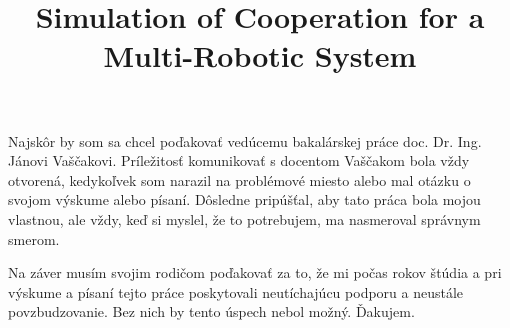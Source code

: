\documentclass[]{tukediphc}
\title{Simulation of Cooperation for a Multi-Robotic System}
\begin{document}
\renewcommand{\figurename}{Obrázok}	
\renewcommand\theHfigure{\theHsection.\arabic{figure}}
\renewcommand\theHtable{\theHsection.\arabic{table}}

\prvastrana

\titulnastrana 



%
%

\abstraktsk %

\abstrakteng %

\kabstrakt %



\cestnevyhlasenie

\podakovanie
Najskôr by som sa chcel poďakovať vedúcemu bakalárskej práce doc. Dr. Ing. Jánovi Vaščakovi. Príležitosť komunikovať s docentom Vaščakom bola vždy otvorená, kedykoľvek som narazil na problémové miesto alebo mal otázku o svojom výskume alebo písaní. Dôsledne pripúšťal, aby tato práca bola mojou vlastnou, ale vždy, keď si myslel, že to potrebujem, ma nasmeroval správnym smerom.

Na záver musím svojim rodičom poďakovať za to, že mi počas rokov štúdia a pri výskume a písaní tejto práce poskytovali neutíchajúcu podporu a neustále povzbudzovanie. Bez nich by tento úspech nebol možný. Ďakujem.
\kpodakovania
\end{document}

